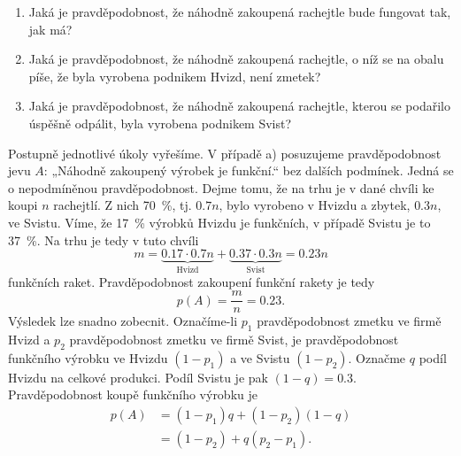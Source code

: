 \begin{mdframed}[style=mdexam]
\begin{example}
      \begin{enumerate}[noitemsep, label=\emph{\alph*}]
        \item Jaká je pravděpodobnost, že náhodně zakoupená rachejtle bude fungovat tak, jak má?
        \item Jaká je pravděpodobnost, že náhodně zakoupená rachejtle, o níž se na obalu píše, že
              byla vyrobena podnikem Hvizd, není zmetek?
        \item Jaká je pravděpodobnost, že náhodně zakoupená rachejtle, kterou se podařilo úspěšně
              odpálit, byla vyrobena podnikem Svist?
      \end{enumerate} 
      Postupně jednotlivé úkoly vyřešíme. V případě a) posuzujeme pravděpodobnost jevu \(A\):
      „Náhodně zakoupený výrobek je funkční.“ bez dalších podmínek. Jedná se o nepodmíněnou
      pravděpodobnost. Dejme tomu, že na trhu je v dané chvíli ke koupi \(n\) rachejtlí. Z nich
      \qty{70}{\percent}, tj. \(\num{0.7}n\), bylo vyrobeno v Hvizdu a zbytek, \(\num{0.3}n\), ve
      Svistu. Víme, že \qty{17}{\percent} výrobků Hvizdu je funkčních, v případě Svistu je to
      \qty{37}{\percent}. Na trhu je tedy v tuto chvíli
      \begin{equation*}
        m = \underbrace{\num{0.17}\cdot\num{0.7}n}_\text{Hvizd} + 
            \underbrace{\num{0.37}\cdot\num{0.3}n}_\text{Svist} = \num{0.23}n
      \end{equation*}
      funkčních raket. Pravděpodobnost zakoupení funkční rakety je tedy
      \begin{equation*}
        p(A) = \dfrac{m}{n} = \num{0.23}.
      \end{equation*}
      Výsledek lze snadno zobecnit. Označíme-li \(p_1\) pravděpodobnost zmetku ve firmě Hvizd a
      \(p_2\) pravděpodobnost zmetku ve firmě Svist, je pravděpodobnost funkčního výrobku ve Hvizdu
      \((1 - p_1)\) a ve Svistu \((1 - p_2)\). Označme \(q\) podíl Hvizdu na celkové produkci. Podíl
      Svistu je pak \((1 - q)=\num{0.3}\). Pravděpodobnost koupě funkčního výrobku je
      \begin{align*}
        p(A) &= (1 - p_1)q + (1 - p_2)(1 - q)    \\
             &= (1 - p_2) + q(p_2 - p_1).
      \end{align*}
      

\end{example}
\end{mdframed}
